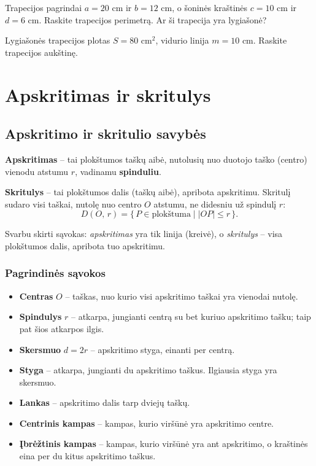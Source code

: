 \begin{exercise}
Trapecijos pagrindai $a = 20$ cm ir $b = 12$ cm, o šoninės kraštinės $c = 10$ cm ir $d = 6$ cm. Raskite trapecijos perimetrą. Ar ši trapecija yra lygiašonė?
\end{exercise}

\begin{exercise}
Lygiašonės trapecijos plotas $S = 80$ cm$^2$, vidurio linija $m = 10$ cm. Raskite trapecijos aukštinę.
\end{exercise}

\section{Apskritimas ir skritulys}

\subsection{Apskritimo ir skritulio savybės}

\begin{definition}
\textbf{Apskritimas} – tai plokštumos taškų aibė, nutolusių nuo duotojo taško (centro) vienodu atstumu $r$, vadinamu \textbf{spinduliu}.
\end{definition}

\begin{definition}
\textbf{Skritulys} – tai plokštumos dalis (taškų aibė), apribota apskritimu. Skritulį sudaro visi taškai, nutolę nuo centro $O$ atstumu, ne didesniu už spindulį $r$:
\[
D(O,\,r) = \{\, P \in \text{plokštuma} \mid |OP| \leq r \,\}.
\]
\end{definition}

\begin{remark}
Svarbu skirti sąvokas: \emph{apskritimas} yra tik linija (kreivė), o \emph{skritulys} – visa plokštumos dalis, apribota tuo apskritimu.
\end{remark}

\subsubsection*{Pagrindinės sąvokos}

\begin{itemize}
  \item \textbf{Centras} $O$ – taškas, nuo kurio visi apskritimo taškai yra vienodai nutolę.
  \item \textbf{Spindulys} $r$ – atkarpa, jungianti centrą su bet kuriuo apskritimo tašku; taip pat šios atkarpos ilgis.
  \item \textbf{Skersmuo} $d = 2r$ – apskritimo styga, einanti per centrą.
  \item \textbf{Styga} – atkarpa, jungianti du apskritimo taškus. Ilgiausia styga yra skersmuo.
  \item \textbf{Lankas} – apskritimo dalis tarp dviejų taškų.
  \item \textbf{Centrinis kampas} – kampas, kurio viršūnė yra apskritimo centre.
  \item \textbf{Įbrėžtinis kampas} – kampas, kurio viršūnė yra ant apskritimo, o kraštinės eina per du kitus apskritimo taškus.
\end{itemize}

